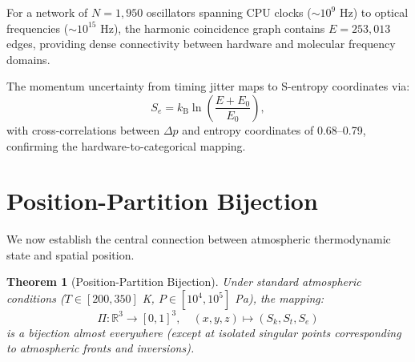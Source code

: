 \documentclass[twocolumn,10pt]{article}
\newtheorem{theorem}{Theorem}[section]
\theoremstyle{definition}
\newcommand{\kB}{k_{\mathrm{B}}}
\newcommand{\Sk}{S_k}
\newcommand{\St}{S_t}
\newcommand{\Se}{S_e}
\newcommand{\R}{\mathbb{R}}
\begin{document}
For a network of $N = 1{,}950$ oscillators spanning CPU clocks ($\sim 10^9$ Hz) to optical frequencies ($\sim 10^{15}$ Hz), the harmonic coincidence graph contains $E = 253{,}013$ edges, providing dense connectivity between hardware and molecular frequency domains.

The momentum uncertainty from timing jitter maps to S-entropy coordinates via:
\begin{equation}
    \Se = \kB\ln\left(\frac{E + E_0}{E_0}\right),
\end{equation}
with cross-correlations between $\Delta p$ and entropy coordinates of 0.68--0.79, confirming the hardware-to-categorical mapping.

\section{Position-Partition Bijection}\label{sec:position_bijection}

We now establish the central connection between atmospheric thermodynamic state and spatial position.

\begin{theorem}[Position-Partition Bijection]\label{thm:bijection}
Under standard atmospheric conditions ($T \in [200, 350]$ K, $P \in [10^4, 10^5]$ Pa), the mapping:
\begin{equation}\label{eq:bijection}
    \boxed{\Pi: \R^3 \to [0,1]^3, \quad (x, y, z) \mapsto (\Sk, \St, \Se)}
\end{equation}
is a bijection almost everywhere (except at isolated singular points corresponding to atmospheric fronts and inversions).
\end{theorem}
\end{document}
